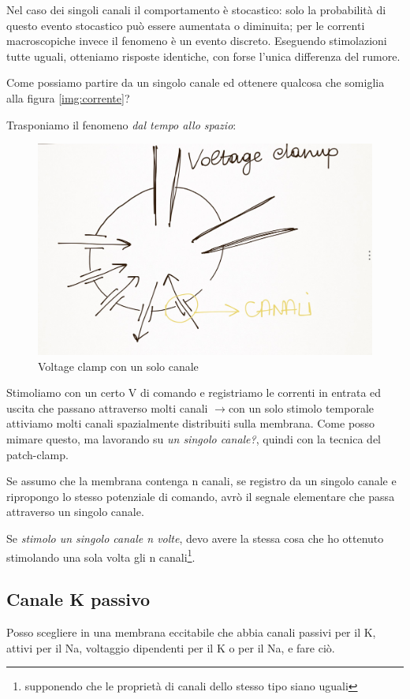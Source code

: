 \documentclass[a4paper,12pt]{article}
\newcommand{\lfreccia}{\ensuremath{\longrightarrow}}
\begin{document}
Nel caso dei singoli canali il comportamento è stocastico: solo la probabilità di questo evento stocastico può essere aumentata o diminuita; per le correnti macroscopiche invece il fenomeno è un evento discreto. Eseguendo stimolazioni tutte uguali, otteniamo risposte identiche, con forse l'unica differenza del rumore. 

Come possiamo partire da un singolo canale ed ottenere qualcosa che somiglia alla figura \ref{img:corrente}?

Trasponiamo il fenomeno \emph{dal tempo allo spazio}: 
\begin{figure}[H]
\centering
\includegraphics[scale=0.1]{immagine/17.jpg}
\caption{Voltage clamp con un solo canale}
\end{figure} 

Stimoliamo con un certo V di comando e registriamo le correnti in entrata ed uscita che passano attraverso molti canali \lfreccia con un solo stimolo temporale attiviamo molti canali spazialmente distribuiti sulla membrana. Come posso mimare questo, ma lavorando su \emph{un singolo canale?}, quindi con la tecnica del patch-clamp.

Se assumo che la membrana contenga n canali, se registro da un singolo canale e ripropongo lo stesso potenziale di comando, avrò il segnale elementare che passa attraverso un singolo canale.

Se \emph{stimolo un singolo canale n volte}, devo avere la stessa cosa che ho ottenuto stimolando una sola volta gli n canali\footnote{supponendo che le proprietà di canali dello stesso tipo siano uguali}.

\subsection{Canale K passivo}
Posso scegliere in una membrana eccitabile che abbia canali passivi per il K, attivi per il Na, voltaggio dipendenti per il K o per il Na, e fare ciò.
\end{document}
